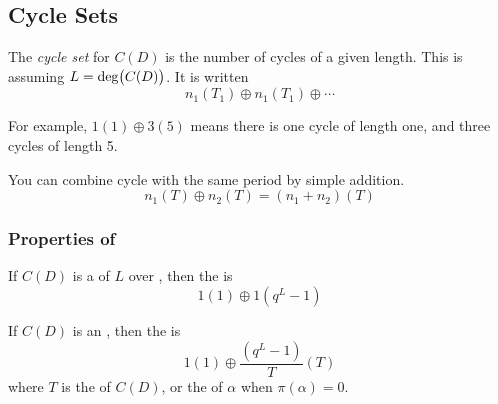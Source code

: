 \subsection{Cycle Sets}\label{subsec:Cycle_Sets}
\begin{definition}\label{def:Cycle_Set}
  The \emph{cycle set} for $C(D)$ is the number of cycles of a given length.
  This is assuming $L = \operatorname{\operatorname{deg}} \bigl( C(D) \bigr)$.
  It is written
  \begin{equation}\label{eq:Cycle_Set}
    n_{1} \left( T_{1} \right) \oplus n_{1} \left( T_{1} \right) \oplus \cdots
  \end{equation}

  For example, $1(1) \oplus 3(5)$ means there is one cycle of length one, and three cycles of length 5.

  \begin{remark}[Combining]
    You can combine cycle with the same period by simple addition.
    \begin{equation}\label{eq:Cycle_Set_Addition}
      n_{1}(T) \oplus n_{2}(T) =  \left( n_{1} + n_{2} \right) (T)
    \end{equation}
  \end{remark}
\end{definition}

\subsubsection{Properties of }\label{subsubsec:Cycle_Set_Properties}
\begin{propertylist}
\item If $C(D)$ is a  of  $L$ over , then the  is\label{prop:Cycle_Set_Properties-Primitive_Polynomial}
  \begin{equation}\label{eq:Primitive_Polynomial_Cycle_Set}
    1(1) \oplus 1 \left( q^{L}-1 \right)
  \end{equation}
\item If $C(D)$ is an  , then the  is\label{prop:Cycle_Set_Properties-Irreducible_Polynomial}
  \begin{equation}\label{eq:Irreducible_Polynomial_Cycle_Set}
    1(1) \oplus \frac{ \left(q^{L} - 1 \right)}{T} (T)
  \end{equation}
  where $T$ is the  of $C(D)$, or the  of $\alpha$ when $\pi(\alpha)=0$.
\end{propertylist}

